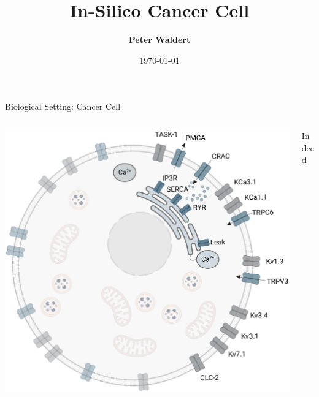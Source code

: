 \documentclass[aspectratio=169, hyperref={colorlinks=true}]{beamer}
\title[IVC Seminar SS2025]{In-Silico Cancer Cell}
\author[Peter Waldert]{\textbf{Peter Waldert}}
\date{\today}
\institute{IVC}
\begin{document}
  \begin{frame}[plain]
    \maketitle
  \end{frame}

  \begin{frame}{Biological Setting: Cancer Cell}
    \begin{columns}
      \begin{column}{0.4\linewidth}
        \includegraphics[width=\linewidth]{../../figures/cell-by-langthaler-et-al.png}
      \end{column}
      \begin{column}{0.58\linewidth}
        Indeed
      \end{column}
    \end{columns}
  \end{frame}
\end{document}

